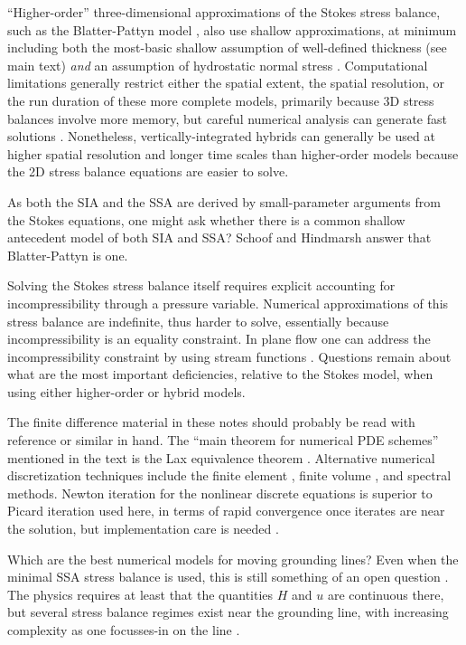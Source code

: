 \documentclass[letterpaper,final,12pt,reqno]{amsart}
\begin{document}
``Higher-order'' three-dimensional approximations of the Stokes stress balance, such as the Blatter-Pattyn model \cite{Blatter,Pattyn03}, also use shallow approximations, at minimum including both the most-basic shallow assumption of well-defined thickness (see main text) \emph{and} an assumption of hydrostatic normal stress \cite{GreveBlatter2009}.  Computational limitations generally restrict either the spatial extent, the spatial resolution, or the run duration of these more complete models, primarily because 3D stress balances involve more memory, but careful numerical analysis can generate fast solutions \cite{Brown2013}.  Nonetheless, vertically-integrated hybrids can generally be used at higher spatial resolution and longer time scales than higher-order models because the 2D stress balance equations are easier to solve.

As both the SIA and the SSA are derived by small-parameter arguments from the Stokes equations, one might ask whether there is a common shallow antecedent model of both SIA and SSA?  Schoof and Hindmarsh \cite{SchoofHindmarsh} answer that Blatter-Pattyn is one.

Solving the Stokes stress balance itself \cite{JouvetRappaz2011,Lengetal2012,ISMIPHOM} requires explicit accounting for incompressibility through a pressure variable.  Numerical approximations of this stress balance are indefinite, thus harder to solve, essentially because incompressibility is an equality constraint.  In plane flow one can address the incompressibility constraint by using stream functions \cite{BaliseRaymond1985}.  Questions remain about what are the most important deficiencies, relative to the Stokes model, when using either higher-order \cite{ISMIPHOM} or hybrid models.

The finite difference material in these notes should probably be read with reference \cite{MortonMayers} or similar in hand.  The ``main theorem for numerical PDE schemes'' mentioned in the text is the Lax equivalence theorem \cite{MortonMayers}.  Alternative numerical discretization techniques include the finite element \cite{Braess}, finite volume \cite{LeVeque}, and spectral \cite{Trefethen} methods.  Newton iteration for the nonlinear discrete equations is superior to Picard iteration used here, in terms of rapid convergence once iterates are near the solution, but implementation care is needed \cite{Kelley}.

Which are the best numerical models for moving grounding lines?  Even when the minimal SSA stress balance is used, this is still something of an open question \cite{Goldbergetal2009,MISMIP3d2013,MISMIP2012,SchoofMarine1}.  The physics requires at least that the quantities $H$ and $u$ are continuous there, but several stress balance regimes exist near the grounding line, with increasing complexity as one focusses-in on the line \cite{SchoofMarine2}.
\end{document}
